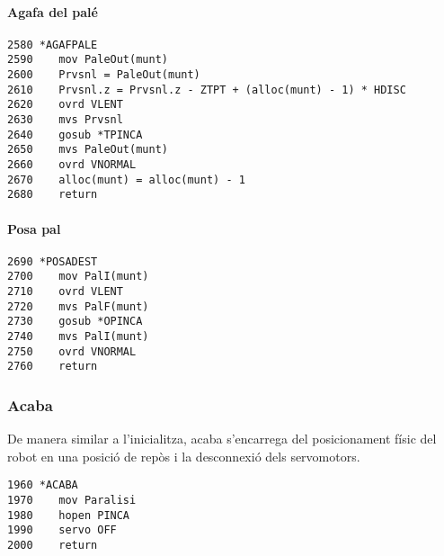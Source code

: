 \paragraph{Agafa del palé}
\begin{verbatim}
2580 *AGAFPALE
2590    mov PaleOut(munt)
2600    Prvsnl = PaleOut(munt)
2610    Prvsnl.z = Prvsnl.z - ZTPT + (alloc(munt) - 1) * HDISC
2620    ovrd VLENT
2630    mvs Prvsnl
2640    gosub *TPINCA
2650    mvs PaleOut(munt)
2660    ovrd VNORMAL
2670    alloc(munt) = alloc(munt) - 1
2680    return
\end{verbatim}


\paragraph{Posa pal}
\begin{verbatim}
2690 *POSADEST
2700    mov PalI(munt)
2710    ovrd VLENT
2720    mvs PalF(munt)
2730    gosub *OPINCA
2740    mvs PalI(munt)
2750    ovrd VNORMAL
2760 	return
\end{verbatim}

\subsubsection{Acaba}
De manera similar a l'inicialitza, acaba s'encarrega del posicionament
físic del robot en una posició de repòs i la desconnexió dels servomotors.

\begin{verbatim}
1960 *ACABA
1970    mov Paralisi
1980    hopen PINCA
1990    servo OFF
2000    return
\end{verbatim}

